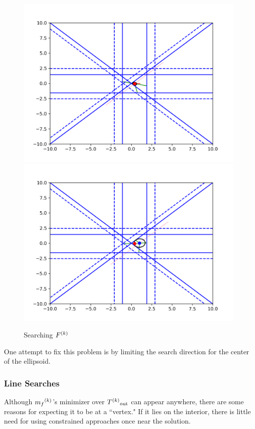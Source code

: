 \begin{figure}[h]
    \centering
    \includegraphics[scale=0.4]{images/everything_runs_1.png}
    \includegraphics[scale=0.4]{images/everything_runs_2.png}
    \caption{Searching ${F}^{(k)}$}
    \label{ellipse_runs_away}
\end{figure}


One attempt to fix this problem is by limiting the search direction for the center of the ellipsoid.


\subsubsection{Line Searches}
Although ${{m}_f}^{(k)}$'s minimizer over ${T^{(k)}}_{\text{out}}$  can appear anywhere, there are some reasons for expecting it to be at a ``vertex."
If it lies on the interior, there is little need for using constrained approaches once near the solution.

